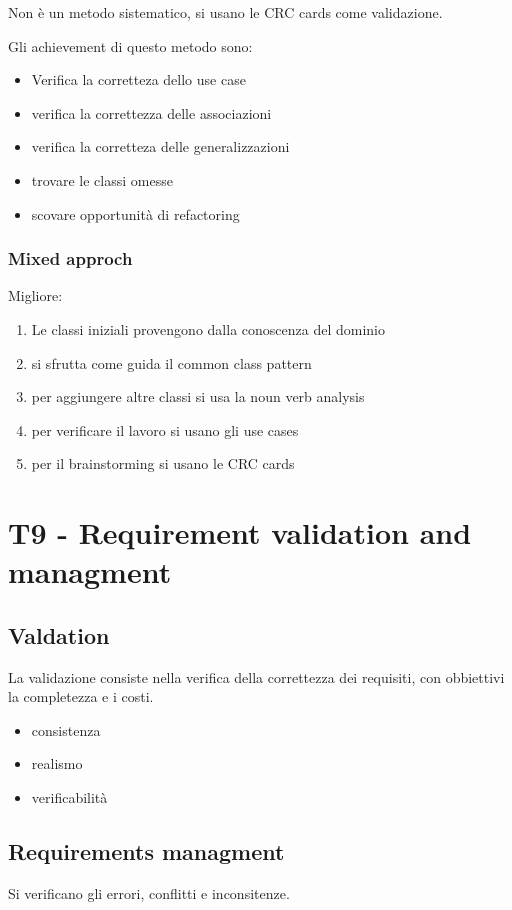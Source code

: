 \documentclass{article}
\begin{document}
Non è un metodo sistematico, si usano le CRC cards come validazione.

Gli achievement di questo metodo sono:
\begin{itemize}
    \item Verifica la corretteza dello use case
    \item verifica la correttezza delle associazioni
    \item verifica la corretteza delle generalizzazioni
    \item trovare le classi omesse
    \item scovare opportunità di refactoring
\end{itemize}

\subsubsection{Mixed approch}
Migliore:
\begin{enumerate}
    \item Le classi iniziali provengono dalla conoscenza del dominio
    \item si sfrutta come guida il common class pattern
    \item per aggiungere altre classi si usa la noun verb analysis
    \item per verificare il lavoro si usano gli use cases
    \item per il brainstorming si usano le CRC cards
\end{enumerate}


\section{T9 - Requirement validation and managment}
\subsection{Valdation}
La validazione consiste nella verifica della correttezza dei requisiti, con obbiettivi
la completezza e i costi.
\begin{itemize}
    \item consistenza
    \item realismo
    \item verificabilità
\end{itemize}
\subsection{Requirements managment}
Si verificano gli errori, conflitti e inconsitenze.
\end{document}
